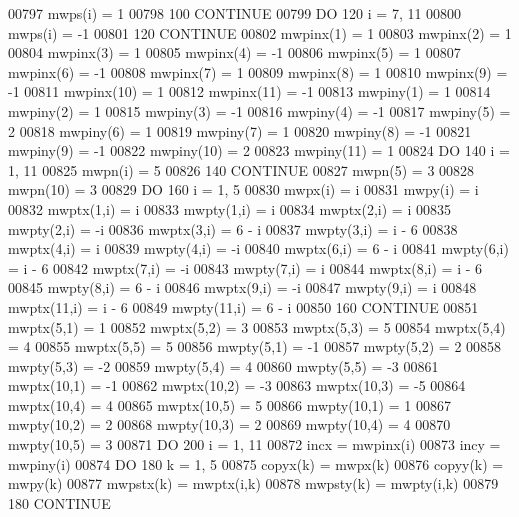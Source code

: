 \begin{DoxyCode}
00797          mwps(i) = 1
00798   100 \textcolor{keywordflow}{CONTINUE}
00799       \textcolor{keywordflow}{DO} 120 i = 7, 11
00800          mwps(i) = -1
00801   120 \textcolor{keywordflow}{CONTINUE}
00802       mwpinx(1) = 1
00803       mwpinx(2) = 1
00804       mwpinx(3) = 1
00805       mwpinx(4) = -1
00806       mwpinx(5) = 1
00807       mwpinx(6) = -1
00808       mwpinx(7) = 1
00809       mwpinx(8) = 1
00810       mwpinx(9) = -1
00811       mwpinx(10) = 1
00812       mwpinx(11) = -1
00813       mwpiny(1) = 1
00814       mwpiny(2) = 1
00815       mwpiny(3) = -1
00816       mwpiny(4) = -1
00817       mwpiny(5) = 2
00818       mwpiny(6) = 1
00819       mwpiny(7) = 1
00820       mwpiny(8) = -1
00821       mwpiny(9) = -1
00822       mwpiny(10) = 2
00823       mwpiny(11) = 1
00824       \textcolor{keywordflow}{DO} 140 i = 1, 11
00825          mwpn(i) = 5
00826   140 \textcolor{keywordflow}{CONTINUE}
00827       mwpn(5) = 3
00828       mwpn(10) = 3
00829       \textcolor{keywordflow}{DO} 160 i = 1, 5
00830          mwpx(i) = i
00831          mwpy(i) = i
00832          mwptx(1,i) = i
00833          mwpty(1,i) = i
00834          mwptx(2,i) = i
00835          mwpty(2,i) = -i
00836          mwptx(3,i) = 6 - i
00837          mwpty(3,i) = i - 6
00838          mwptx(4,i) = i
00839          mwpty(4,i) = -i
00840          mwptx(6,i) = 6 - i
00841          mwpty(6,i) = i - 6
00842          mwptx(7,i) = -i
00843          mwpty(7,i) = i
00844          mwptx(8,i) = i - 6
00845          mwpty(8,i) = 6 - i
00846          mwptx(9,i) = -i
00847          mwpty(9,i) = i
00848          mwptx(11,i) = i - 6
00849          mwpty(11,i) = 6 - i
00850   160 \textcolor{keywordflow}{CONTINUE}
00851       mwptx(5,1) = 1
00852       mwptx(5,2) = 3
00853       mwptx(5,3) = 5
00854       mwptx(5,4) = 4
00855       mwptx(5,5) = 5
00856       mwpty(5,1) = -1
00857       mwpty(5,2) = 2
00858       mwpty(5,3) = -2
00859       mwpty(5,4) = 4
00860       mwpty(5,5) = -3
00861       mwptx(10,1) = -1
00862       mwptx(10,2) = -3
00863       mwptx(10,3) = -5
00864       mwptx(10,4) = 4
00865       mwptx(10,5) = 5
00866       mwpty(10,1) = 1
00867       mwpty(10,2) = 2
00868       mwpty(10,3) = 2
00869       mwpty(10,4) = 4
00870       mwpty(10,5) = 3
00871       \textcolor{keywordflow}{DO} 200 i = 1, 11
00872          incx = mwpinx(i)
00873          incy = mwpiny(i)
00874          \textcolor{keywordflow}{DO} 180 k = 1, 5
00875             copyx(k) = mwpx(k)
00876             copyy(k) = mwpy(k)
00877             mwpstx(k) = mwptx(i,k)
00878             mwpsty(k) = mwpty(i,k)
00879   180    \textcolor{keywordflow}{CONTINUE}

\end{DoxyCode}

